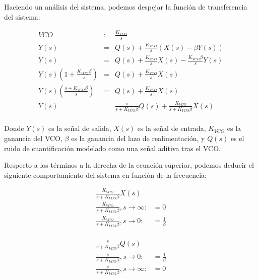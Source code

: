 \documentclass[12pt]{report} %
\begin{document}
	Haciendo un análisis del sistema, podemos despejar la función de transferencia del sistema:
	
	\begin{figure}[H]
		\label{vco-closed-loop-s}
		\begin{equation}
		\begin{array}{lcl}
		VCO & : & \frac{K_{VCO}}{s} \\
		Y(s) &=& Q(s) + \frac{K_{VCO}}{s}(X(s) - \beta Y(s) ) \\
		Y(s) &=& Q(s) + \frac{K_{VCO}}{s}X(s) - \frac{K_{VCO} \beta}{s}Y(s) \\
		Y(s) (1 + \frac{K_{VCO}\beta}{s}) &=& Q(s) + \frac{K_{VCO}}{s}X(s) \\
		Y(s) (\frac{s + K_{VCO}\beta}{s}) &=& Q(s) + \frac{K_{VCO}}{s}X(s) \\
		Y(s) &=& \frac{s}{s + K_{VCO}\beta}Q(s) + \frac{K_{VCO}}{s + K_{VCO}\beta}X(s) \\
		\end{array}
		\end{equation}
	\end{figure}
	
	Donde $Y(s)$ es la señal de salida, $X(s)$ es la señal de entrada, $K_{VCO}$ es la ganancia del VCO, $\beta$ es la ganancia del lazo de realimentación, y $Q(s)$ es el ruido de cuantificación modelado como una señal aditiva tras el VCO.
	
	Respecto a los términos a la derecha de la ecuación superior, podemos deducir el siguiente comportamiento del sistema en función de la frecuencia:
	
	\begin{figure}[H]
		\label{vco-closed-loop-terms-x}
		\begin{equation}
		\begin{array}{lcl}
		\frac{K_{VCO}}{s + K_{VCO}\beta}X(s) & \\
		\frac{K_{VCO}}{s + K_{VCO}\beta}, s \to \infty: & = 0 \\
		\frac{K_{VCO}}{s + K_{VCO}\beta}, s \to 0: & = \frac{1}{\beta} \\
		\end{array}
		\end{equation}
	\end{figure}

	\begin{figure}[H]
		\label{vco-closed-loop-terms-q}
		\begin{equation}
		\begin{array}{lcl}
		\frac{s}{s + K_{VCO}\beta}Q(s) & \\
		\frac{s}{s + K_{VCO}\beta}, s \to 0: & = \frac{1}{\beta} \\
		\frac{s}{s + K_{VCO}\beta}, s \to \infty: & = 0 \\
		\end{array}
		\end{equation}
	\end{figure}
\end{document}
